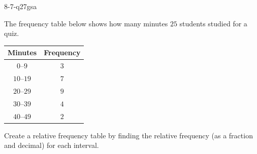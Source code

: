 \begin{practiceQuestion}{8-7-q27}{gsa}
\begin{questionText}
The frequency table below shows how many minutes $25$ students studied for a quiz.

\begin{center}
\begin{tabular}{|c|c|}
\hline
\textbf{Minutes} & \textbf{Frequency} \\
\hline
$0$--$9$ & $3$ \\
$10$--$19$ & $7$ \\
$20$--$29$ & $9$ \\
$30$--$39$ & $4$ \\
$40$--$49$ & $2$ \\
\hline
\end{tabular}
\end{center}

Create a relative frequency table by finding the relative frequency (as a fraction and decimal) for each interval.
\end{questionText}
\end{practiceQuestion}
